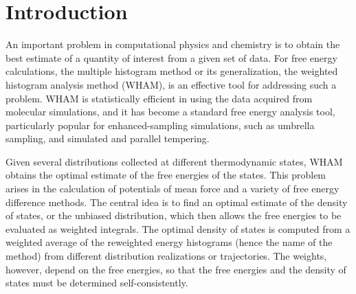 \documentclass[aip,jcp,preprint,superscriptaddress]{revtex4-1}
\begin{document}
\maketitle




\section{Introduction}





An important problem in computational physics and chemistry
is to obtain the best estimate of a quantity of interest
from a given set of data\cite{
shirts2008}.
%
For free energy calculations,
the multiple histogram method\cite{
ferrenberg1988, *ferrenberg1989,
newman, frenkel}
or its generalization,
the weighted histogram analysis method (WHAM)\cite{
kumar1992, roux1995,
bartels1997, *gallicchio2005, *habeck2007, *habeck2012,
souaille2001,
chodera2007, shirts2008, bereau2009,
hub2010, zhu2012},
is an effective tool for
addressing such a problem.
%
WHAM is statistically efficient in using the data
acquired from molecular simulations,
and it has become
a standard free energy analysis tool,
particularly popular
for enhanced-sampling simulations,
such as umbrella sampling\cite{
torrie1974, *laio2002},
and simulated\cite{
marinari1992, *lyubartsev1992}
and parallel\cite{
swendsen1986, *geyer1991, *hukushima1996, *hansmann1997, *earl2005}
tempering.




Given several distributions collected
at different thermodynamic states,
WHAM obtains the optimal estimate
of the free energies of the states.
%
This problem arises in the calculation of potentials of mean force and a variety of free energy difference methods.
%
The central idea  is to find an optimal estimate
of the density of states,
or the unbiased distribution,
which then allows
the free energies to be evaluated
as weighted integrals.
%
The optimal density of states
is computed from a weighted average
of the reweighted energy histograms
(hence the name of the method)
from different distribution realizations or trajectories.
%
The weights, however,
depend on the free energies,
so that
the free energies
and the density of states
must be determined self-consistently.
\end{document}
